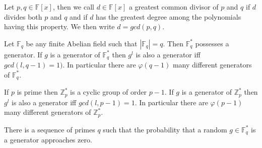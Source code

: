 \documentclass[a4paper]{article}
\begin{document}
\begin{samepage}
\begin{definition}
Let $p, q \in \mathbb{F}[x]$, then we call $d \in \mathbb{F}[x]$ a greatest common divisor of $p$ and $q$ if $d$ divides both $p$ and $q$ and if $d$ has the greatest degree among the polynomials having this property. We then write $d = gcd(p, q)$.
\end{definition}
\end{samepage}


\begin{theorem}
Let $\mathbb{F}_{q}$ be any finite Abelian field such that $|\mathbb{F}_{q}| = q$. Then $\mathbb{F}_{q}^{*}$ possesses a generator. If $g$ is a generator of $\mathbb{F}_{q}^{*}$ then $g^{l}$ is also a generator iff $gcd(l, q - 1) = 1)$. In particular there are $\varphi (q - 1)$ many different generators of $\mathbb{F}_{q}^{*}$.
\end{theorem}


\begin{corollary}
If $p$ is prime then $\mathbb{Z}_{p}^{*}$ is a cyclic group of order $p - 1$. If $g$ is a generator of $\mathbb{Z}_{p}^{*}$ then $g^{l}$ is also a generator iff $gcd(l, p - 1) = 1$. In particular there are $\varphi (p - 1)$ many different generators of $\mathbb{Z}_{p}^{*}$.
\end{corollary}

\begin{theorem}
There is a sequence of primes $q$ such that the probability that a random $g \in \mathbb{F}_{q}^{*}$ is a generator approaches zero.
\end{theorem}
\end{document}
